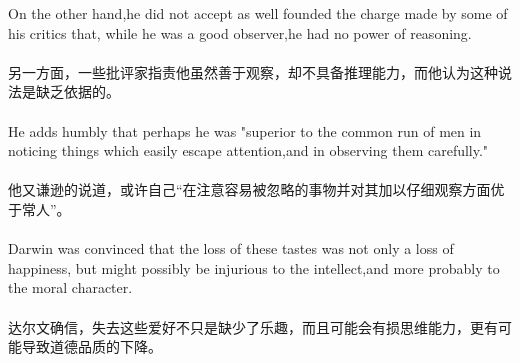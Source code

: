 \documentclass[UTF8]{article}
\begin{document}
    On the other hand,he did not accept as well founded the charge made by some of his critics that,
    while he was a good observer,he had no power of reasoning.\\
    \\
    另一方面，一些批评家指责他虽然善于观察，却不具备推理能力，而他认为这种说法是缺乏依据的。\\
    \\

    He adds humbly that perhaps he was "superior to the common run of men in noticing things which easily 
    escape attention,and in observing them carefully."\\
    \\
    他又谦逊的说道，或许自己“在注意容易被忽略的事物并对其加以仔细观察方面优于常人”。\\
    \\

    Darwin was convinced that the loss of these tastes was not only a loss of happiness,
    but might possibly be injurious to the intellect,and more probably to the moral character.\\
    \\
    达尔文确信，失去这些爱好不只是缺少了乐趣，而且可能会有损思维能力，更有可能导致道德品质的下降。
\end{document}
